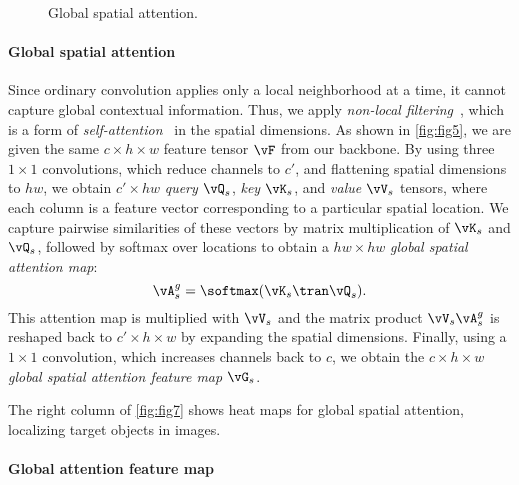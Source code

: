\begin{figure}
\centering

\caption{Global spatial attention.}
\label{fig:fig5}
\end{figure}

\paragraph{Global spatial attention}

Since ordinary convolution applies only a local neighborhood at a time, it cannot capture global contextual information. Thus, we apply \emph{non-local filtering}~\cite{Wang02}, which is a form of \emph{self-attention}~\cite{Vaswani01} in the spatial dimensions. As shown in \autoref{fig:fig5}, we are given the same $c\times h\times w$ feature tensor $\vF$ from our backbone. By using three $1\times 1$ convolutions, which reduce channels to $c'$, and flattening spatial dimensions to $hw$, we obtain $c' \times hw$ \emph{query} $\vQ_s$, \emph{key} $\vK_s$, and \emph{value} $\vV_s$ tensors, where each column is a feature vector corresponding to a particular spatial location. We capture pairwise similarities of these vectors by matrix multiplication of $\vK_s$ and $\vQ_s$, followed by softmax over locations to obtain a $hw \times hw$ \emph{global spatial attention map}:
\begin{equation}
	\vA_s^g = \softmax(\vK_s\tran \vQ_s).
\label{eq:eq4-1}
\end{equation}
This attention map is multiplied with $\vV_s$ and the matrix product $\vV_s \vA_s^g$ is reshaped back to $c' \times h \times w$ by expanding the spatial dimensions. Finally, using a ${1\times 1}$ convolution, which increases channels back to $c$, we obtain the $c \times h\times w$ \emph{global spatial attention feature map} $\vG_s$.

The right column of \autoref{fig:fig7} shows heat maps for global spatial attention, localizing target objects in images.


\paragraph{Global attention feature map}

